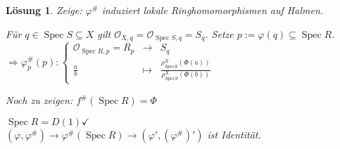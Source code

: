 \documentclass[a4paper, 12pt, numbers=noendperiod, chapterprefix=true]{scrbook}
\theoremstyle{break}
\newtheorem{Loes}{L\"osung}
\theoremstyle{nonumberbreak}
\theoremstyle{nonumberplain}
\DeclareMathOperator{\Spec}{Spec}
\newcommand{\calO}{\mathcal{O}}
\begin{document}
\begin{Loes}
\emph{Zeige:} $\varphi^\#$ induziert lokale Ringhomomorphismen auf Halmen.

F\"ur $q \in \Spec S \subseteq X$ gilt $\calO_{X,q} = \calO_{\Spec S, q} = S_q$. Setze $p:= \varphi(q) \subseteq \Spec R$.\\
$\Rightarrow \varphi_p^\#(p): \left\{ \begin{array}{rcl} \calO_{\Spec R, p} = R_p &\to& S_q \\ \frac{a}{b} &\mapsto& \frac{\rho_{Spec S}^X (\Phi(a))}{\rho_{Spec S}^X (\Phi(b))} \end{array}\right.$

\emph{Noch zu zeigen:} $f^\#(\Spec R) = \Phi$

$\Spec R = D(1) \checkmark$\\
$(\varphi, \varphi^\#) \to \varphi^\#(\Spec R) \to (\varphi', (\varphi^{\#})' )$ ist Identit\"at.
\end{Loes}
\end{document}
